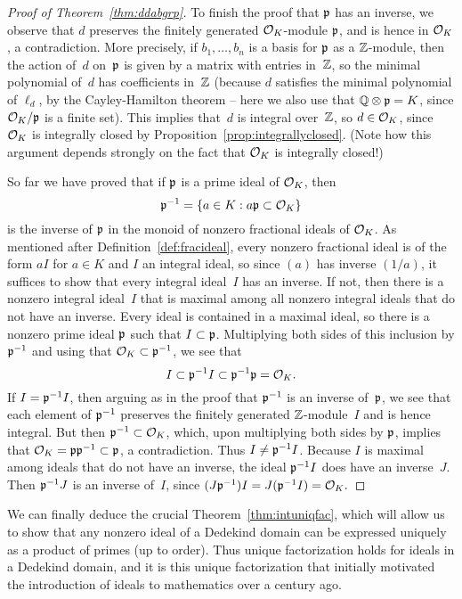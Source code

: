 \begin{proof}[Proof of Theorem~\ref{thm:ddabgrp}]
To finish the proof that $\mathfrak{p}$ has an inverse, we observe that $d$
preserves the finitely generated $\mathcal{O}_K$-module $\mathfrak{p}$, and is hence in $\mathcal{O}_K$, a
contradiction.  More precisely, if $b_1,\ldots, b_n$ is a basis for
$\mathfrak{p}$ as a $\mathbb{Z}$-module, then the action of~$d$ on~$\mathfrak{p}$ is given by a
matrix with entries in~$\mathbb{Z}$, so the minimal polynomial of~$d$ has
coefficients in~$\mathbb{Z}$ (because $d$ satisfies the minimal polynomial of
$\ell_d$, by the Cayley-Hamilton theorem -- here we also use that
$\mathbb{Q}\otimes\mathfrak{p} = K$, since $\mathcal{O}_K/\mathfrak{p}$ is a finite set).  This implies
that~$d$ is integral over~$\mathbb{Z}$, so $d\in \mathcal{O}_K$, since~$\mathcal{O}_K$ is
integrally closed by Proposition~\ref{prop:integrallyclosed}.  (Note
how this argument depends strongly on the fact that $\mathcal{O}_K$ is
integrally closed!)

So far we have proved that if $\mathfrak{p}$ is a prime ideal of $\mathcal{O}_K$, then
$$
  \mathfrak{p}^{-1} = \{a \in K : a\mathfrak{p} \subset \mathcal{O}_K\}
$$
is the inverse of $\mathfrak{p}$ in
the monoid of nonzero fractional ideals of $\mathcal{O}_K$.  As mentioned after
Definition~\ref{def:fracideal}, every nonzero fractional
ideal is of the form $aI$ for $a\in K$ and $I$ an integral ideal, so
since $(a)$ has inverse $(1/a)$, it suffices to show that every
integral ideal~$I$ has an inverse.  If not, then there is a nonzero
integral ideal~$I$ that is maximal among all nonzero integral ideals
that do not have an inverse.  Every ideal is contained in a maximal
ideal, so there is a nonzero prime ideal $\mathfrak{p}$ such that $I\subset \mathfrak{p}$.
Multiplying both sides of this inclusion by $\mathfrak{p}^{-1}$ and using that
$\mathcal{O}_K\subset \mathfrak{p}^{-1}$, we see that
$$
  I \subset \mathfrak{p}^{-1} I \subset \mathfrak{p}^{-1}\mathfrak{p} = \mathcal{O}_K.
$$
If $I = \mathfrak{p}^{-1} I$, then arguing as in the proof that $\mathfrak{p}^{-1}$ is an
inverse of~$\mathfrak{p}$, we see that each element of $\mathfrak{p}^{-1}$ preserves the
finitely generated $\mathbb{Z}$-module~$I$ and is hence integral.  But then
$\mathfrak{p}^{-1}\subset \mathcal{O}_K$, which, upon multiplying both sides by $\mathfrak{p}$,
implies that $\mathcal{O}_K = \mathfrak{p} \mathfrak{p}^{-1} \subset \mathfrak{p}$, a contradiction.
Thus $I \neq \mathfrak{p}^{-1} I$.  Because $I$ is
maximal among ideals that do not have an inverse, the ideal $\mathfrak{p}^{-1}
I$ does have an inverse~$J$.
Then $\mathfrak{p}{}^{-1}J$ is an inverse of~$I$, since
$
(J\mathfrak{p}^{-1})I = J(\mathfrak{p}^{-1}I) = \mathcal{O}_K.
$
\end{proof}

We can finally deduce the crucial Theorem~\ref{thm:intuniqfac}, which
will allow us to show that any nonzero ideal of a Dedekind domain can
be expressed uniquely as a product of primes (up to order).  Thus
unique factorization holds for ideals in a Dedekind domain, and it is
this unique factorization that initially motivated the introduction of
ideals to mathematics over a century ago.

